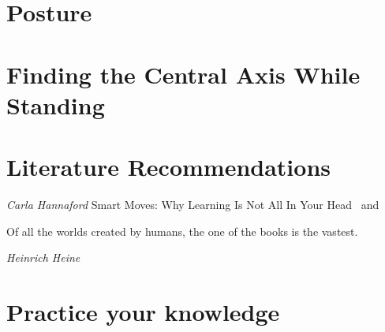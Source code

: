 \documentclass[../main.tex]{subfiles}
\begin{document}


\chapter{Posture}


\newpage

\chapter{Finding the Central Axis While Standing}





\chapter{Literature Recommendations}

\textit{Carla Hannaford} Smart Moves: Why Learning Is Not All In Your Head~\cite{BraingymE} and~\cite{BraingymD}

\epigraph{Of all the worlds created by humans, the one of the books is the vastest.}{\textit{Heinrich Heine}}

\chapter{Practice your knowledge}

\end{document}
